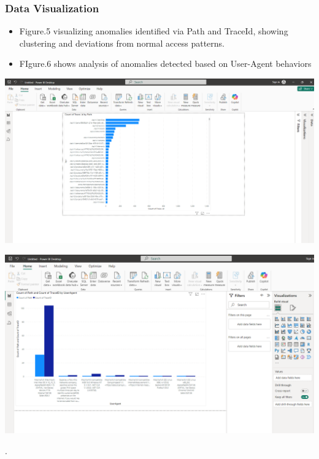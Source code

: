 \documentclass[10pt, a4paper]{beamer}
\begin{document}
	\begin{frame}
		\frametitle{Data Visualization}
		
		\begin{itemize}
			\item Figure.5 visualizing anomalies identified via Path and TraceId, showing clustering and deviations from normal access patterns.
			\item FIgure.6 shows analysis of anomalies detected based on User-Agent behaviors
		\end{itemize}
		
		\begin{minipage}{0.48\textwidth}
			\centering
			\includegraphics[width=\textwidth]{images/PowerBI_1.png}
		\end{minipage}
		\hfill
		\begin{minipage}{0.48\textwidth}
			\centering
			\includegraphics[width=\textwidth]{images/PowerBI_2.png}
		\end{minipage}
		
		
		.\end{frame}
	
\end{document}
